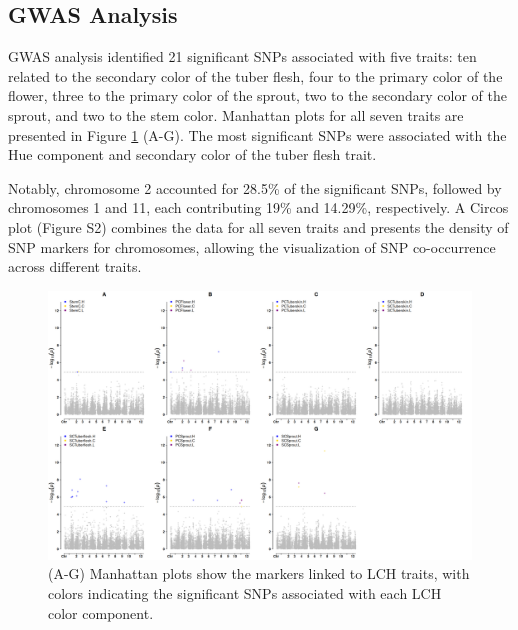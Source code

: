 \documentclass[pdflatex,sn-mathphys-ay]{sn-jnl}%
\begin{document}
\subsection{GWAS  Analysis}


 GWAS analysis identified 21 significant SNPs associated with five traits: ten related to the secondary color of the tuber flesh, four to the primary color of the flower,  three to the primary color of the sprout, two to the secondary color of the sprout, and two to the stem color. Manhattan plots for all seven traits are presented in Figure \ref{fig:GWAS-Top-Markers-GSCORE} (A-G). The most significant SNPs were associated with the Hue component and secondary color of the tuber flesh trait. %


Notably, chromosome 2 accounted for 28.5\% of the significant SNPs, followed by chromosomes 1 and 11, each contributing 19\% and 14.29\%, respectively. 
A Circos plot (Figure S2) combines the data for all seven traits and presents the density of SNP markers for chromosomes, allowing the visualization of SNP co-occurrence across different traits. 




\begin{figure}[H]
\begin{centering}
\begin{center}
\includegraphics[width=15cm]{Figures/Fig4v4.png}

\par\end{center}%

\par\end{centering}
\caption{(A-G) Manhattan plots show the markers linked to LCH traits, with colors indicating the significant SNPs associated with each LCH color component.\label{fig:GWAS-Top-Markers-GSCORE}}
\end{figure}
\end{document}
